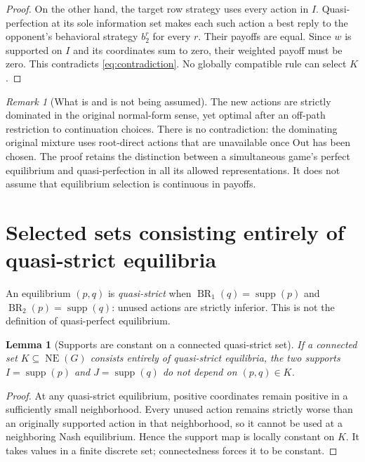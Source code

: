 \documentclass[11pt]{article}
\newcommand{\NE}{\operatorname{NE}}
\newcommand{\BR}{\operatorname{BR}}
\newcommand{\supp}{\operatorname{supp}}
\newtheorem{lemma}[theorem]{Lemma}
\theoremstyle{definition}
\theoremstyle{remark}
\newtheorem{remark}[theorem]{Remark}
\begin{document}
\begin{proof}
On the other hand, the target row strategy uses every action in $I$.
Quasi-perfection at its sole information set makes each such action a
best reply to the opponent's behavioral strategy $b_2^r$ for every $r$.
Their payoffs are equal. Since $w$ is supported on $I$ and its coordinates
sum to zero, their weighted payoff must be zero. This contradicts
\eqref{eq:contradiction}. No globally compatible rule can select $K$.
\end{proof}

\begin{remark}[What is and is not being assumed]
The new actions are strictly dominated in the original normal-form sense,
yet optimal after an off-path restriction to continuation choices. There
is no contradiction: the dominating original mixture uses root-direct
actions that are unavailable once $\mathrm{Out}$ has been chosen.
The proof retains the distinction between a simultaneous game's perfect
equilibrium and quasi-perfection in all its allowed representations.
It does not assume that equilibrium selection is continuous in payoffs.
\end{remark}


\section{Selected sets consisting entirely of quasi-strict equilibria}
An equilibrium $(p,q)$ is \emph{quasi-strict} when
$\BR_1(q)=\supp(p)$ and $\BR_2(p)=\supp(q)$: unused actions are
strictly inferior. This is not the definition of quasi-perfect equilibrium.

\begin{lemma}[Supports are constant on a connected quasi-strict set]
\label{lem:supports}
If a connected set $K\subseteq\NE(G)$ consists entirely of quasi-strict
equilibria, the two supports $I=\supp(p)$ and $J=\supp(q)$ do not depend
on $(p,q)\in K$.
\end{lemma}
\begin{proof}
At any quasi-strict equilibrium, positive coordinates remain positive in
a sufficiently small neighborhood. Every unused action remains strictly
worse than an originally supported action in that neighborhood, so it
cannot be used at a neighboring Nash equilibrium. Hence the support map
is locally constant on $K$. It takes values in a finite discrete set;
connectedness forces it to be constant.
\end{proof}
\end{document}
